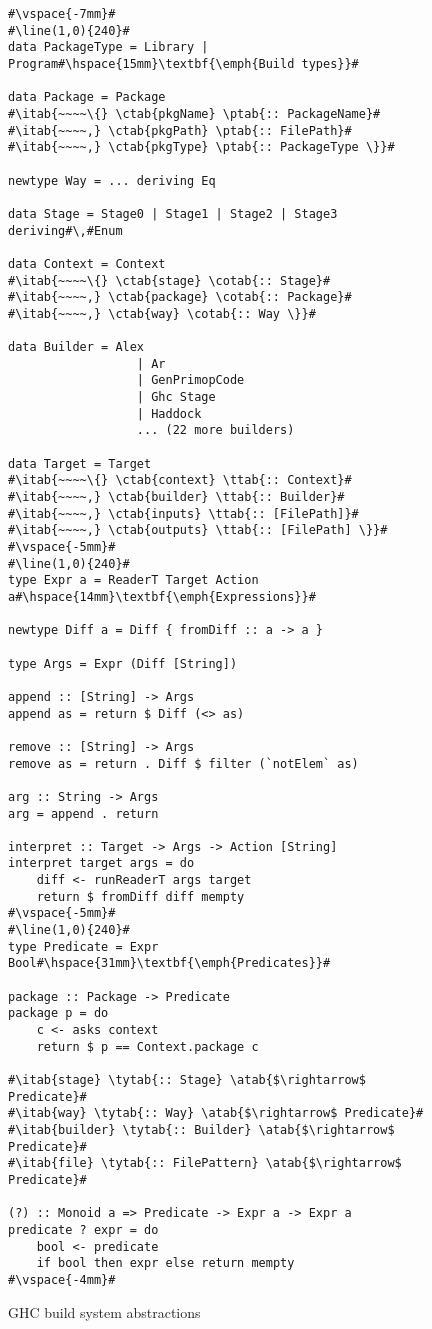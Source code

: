 \begin{figure}
\begin{lstlisting}
#\vspace{-7mm}#
#\line(1,0){240}#
data PackageType = Library | Program#\hspace{15mm}\textbf{\emph{Build types}}#

data Package = Package
#\itab{~~~~\{} \ctab{pkgName} \ptab{:: PackageName}#
#\itab{~~~~,} \ctab{pkgPath} \ptab{:: FilePath}#
#\itab{~~~~,} \ctab{pkgType} \ptab{:: PackageType \}}#

newtype Way = ... deriving Eq

data Stage = Stage0 | Stage1 | Stage2 | Stage3 deriving#\,#Enum

data Context = Context
#\itab{~~~~\{} \ctab{stage} \cotab{:: Stage}#
#\itab{~~~~,} \ctab{package} \cotab{:: Package}#
#\itab{~~~~,} \ctab{way} \cotab{:: Way \}}#

data Builder = Alex
                  | Ar
                  | GenPrimopCode
                  | Ghc Stage
                  | Haddock
                  ... (22 more builders)

data Target = Target
#\itab{~~~~\{} \ctab{context} \ttab{:: Context}#
#\itab{~~~~,} \ctab{builder} \ttab{:: Builder}#
#\itab{~~~~,} \ctab{inputs} \ttab{:: [FilePath]}#
#\itab{~~~~,} \ctab{outputs} \ttab{:: [FilePath] \}}#
#\vspace{-5mm}#
#\line(1,0){240}#
type Expr a = ReaderT Target Action a#\hspace{14mm}\textbf{\emph{Expressions}}#

newtype Diff a = Diff { fromDiff :: a -> a }

type Args = Expr (Diff [String])

append :: [String] -> Args
append as = return $ Diff (<> as)

remove :: [String] -> Args
remove as = return . Diff $ filter (`notElem` as)

arg :: String -> Args
arg = append . return

interpret :: Target -> Args -> Action [String]
interpret target args = do
    diff <- runReaderT args target
    return $ fromDiff diff mempty
#\vspace{-5mm}#
#\line(1,0){240}#
type Predicate = Expr Bool#\hspace{31mm}\textbf{\emph{Predicates}}#

package :: Package -> Predicate
package p = do
    c <- asks context
    return $ p == Context.package c

#\itab{stage} \tytab{:: Stage} \atab{$\rightarrow$ Predicate}#
#\itab{way} \tytab{:: Way} \atab{$\rightarrow$ Predicate}#
#\itab{builder} \tytab{:: Builder} \atab{$\rightarrow$ Predicate}#
#\itab{file} \tytab{:: FilePattern} \atab{$\rightarrow$ Predicate}#

(?) :: Monoid a => Predicate -> Expr a -> Expr a
predicate ? expr = do
    bool <- predicate
    if bool then expr else return mempty
#\vspace{-4mm}#
\end{lstlisting}
\caption{GHC build system abstractions\label{fig:abstractions}}
\end{figure}

